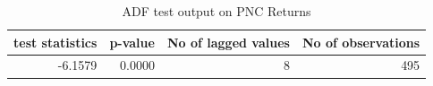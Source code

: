 \begin{table}[!ht] 
\centering 
\resizebox{0.7\textwidth}{!} { 
\begin{tabular}{rrrr}
\toprule
test statistics & p-value & No of lagged values & No of observations \\
\midrule
-6.1579 & 0.0000 & 8 & 495 \\
\bottomrule
\end{tabular}} 
\caption {ADF test output on PNC Returns} 
\label {adf_pnc} 
\end{table} 
\FloatBarrier